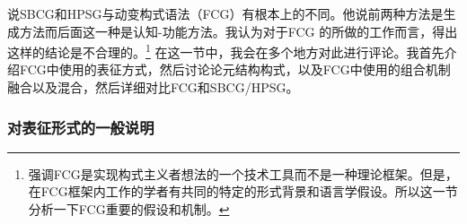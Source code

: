 说SBCG和HPSG与动变构式语法（FCG）有根本上的不同。他说前两种方法是生成方法而后面这一种是认知-功能方法。我认为对于FCG 的所做的工作而言，得出这样的结论是不合理的。\footnote{\label{Steels-FCG-System}%
   \citet[]{Steels2013a}强调FCG是实现构式主义者想法的一个技术工具而不是一种理论框架。但是，在FCG框架内工作的学者有共同的特定的形式背景和语言学假设。所以这一节分析一下FCG重要的假设和机制。} 在这一节中，我会在多个地方对此进行评论。我首先介绍FCG中使用的表征方式，然后讨论论元结构构式，以及FCG中使用的组合机制融合以及混合，然后详细对比FCG和SBCG/HPSG。

\subsubsection{对表征形式的一般说明}

